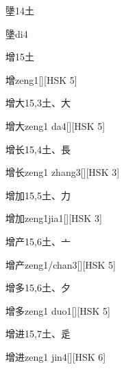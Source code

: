 \begin{Entry}{墬}{14}{⼟}
  \begin{Phonetics}{墬}{di4}
  \end{Phonetics}
\end{Entry}

\begin{Entry}{增}{15}{⼟}
  \begin{Phonetics}{增}{zeng1}[][HSK 5]
  \end{Phonetics}
\end{Entry}

\begin{Entry}{增大}{15,3}{⼟、⼤}
  \begin{Phonetics}{增大}{zeng1 da4}[][HSK 5]
  \end{Phonetics}
\end{Entry}

\begin{Entry}{增长}{15,4}{⼟、⾧}
  \begin{Phonetics}{增长}{zeng1 zhang3}[][HSK 3]
  \end{Phonetics}
\end{Entry}

\begin{Entry}{增加}{15,5}{⼟、⼒}
  \begin{Phonetics}{增加}{zeng1jia1}[][HSK 3]
  \end{Phonetics}
\end{Entry}

\begin{Entry}{增产}{15,6}{⼟、⼇}
  \begin{Phonetics}{增产}{zeng1/chan3}[][HSK 5]
  \end{Phonetics}
\end{Entry}

\begin{Entry}{增多}{15,6}{⼟、⼣}
  \begin{Phonetics}{增多}{zeng1 duo1}[][HSK 5]
  \end{Phonetics}
\end{Entry}

\begin{Entry}{增进}{15,7}{⼟、⾡}
  \begin{Phonetics}{增进}{zeng1 jin4}[][HSK 6]
  \end{Phonetics}
\end{Entry}


